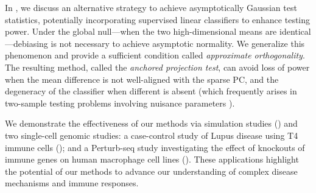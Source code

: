 \documentclass[11pt]{article}
\begin{document}
In , we discuss an alternative strategy to achieve asymptotically Gaussian test statistics, potentially incorporating supervised linear classifiers to enhance testing power. Under the global null---when the two high-dimensional means are identical---debiasing is not necessary to achieve asymptotic normality. We generalize this phenomenon and provide a sufficient condition called \emph{approximate orthogonality}. 
The resulting method, called the \emph{anchored projection test}, can avoid loss of power when the mean difference is not well-aligned with the sparse PC, and the degeneracy of the classifier when different is absent (which frequently arises in two-sample testing problems involving nuisance parameters \citep{liu2022multiple, williamson2023general, dai2022significance, lundborg2022projected}).

We demonstrate the effectiveness of our methods via simulation studies () and two single-cell genomic studies: a case-control study \citep{perez2022single} of Lupus disease using T4 immune cells (); and a Perturb-seq \citep{yao2024scalable} study investigating the effect of knockouts of immune genes on human macrophage cell lines (). These applications highlight the potential of our methods to advance our understanding of complex disease mechanisms and immune responses.  

\end{document}
